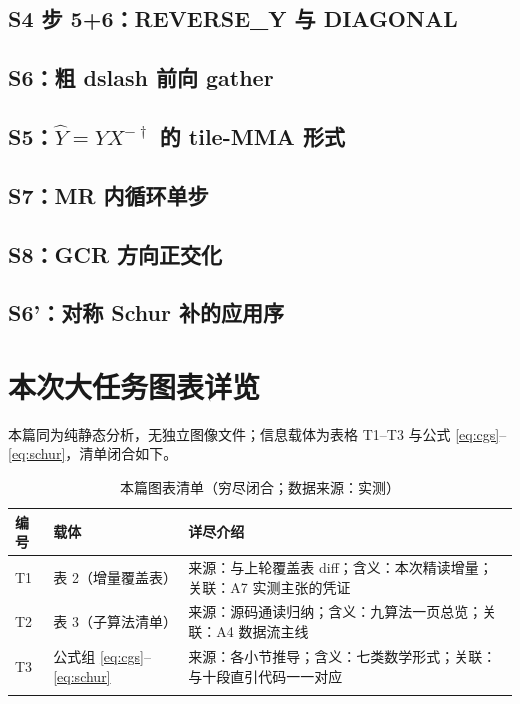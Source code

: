 \documentclass[UTF8]{ctexart}
\begin{document}
\subsection{S4 步 5+6：REVERSE\_Y 与 DIAGONAL}


\subsection{S6：粗 dslash 前向 gather}


\subsection{S5：$\hat Y=Y X^{-\dagger}$ 的 tile-MMA 形式}


\subsection{S7：MR 内循环单步}


\subsection{S8：GCR 方向正交化}


\subsection{S6'：对称 Schur 补的应用序}


\section{本次大任务图表详览}

本篇同为纯静态分析，无独立图像文件；信息载体为表格 T1--T3 与公式 \eqref{eq:cgs}--\eqref{eq:schur}，清单闭合如下。

\begin{xltabular}{\textwidth}{llX}
\toprule
编号 & 载体 & 详尽介绍 \\
\midrule
\endhead
T1 & 表 2（增量覆盖表） & 来源：与上轮覆盖表 diff；含义：本次精读增量；关联：A7 实测主张的凭证 \\
T2 & 表 3（子算法清单） & 来源：源码通读归纳；含义：九算法一页总览；关联：A4 数据流主线 \\
T3 & 公式组 \eqref{eq:cgs}--\eqref{eq:schur} & 来源：各小节推导；含义：七类数学形式；关联：与十段直引代码一一对应 \\
\bottomrule
\caption{本篇图表清单（穷尽闭合；数据来源：实测）}
\end{xltabular}
\end{document}
